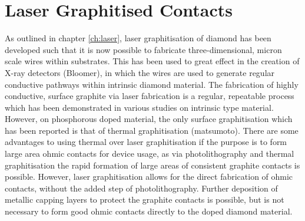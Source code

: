 \section{Laser Graphitised Contacts}
As outlined in chapter \ref{ch:laser}, laser graphitisation of diamond has been developed such that it is now possible to fabricate three-dimensional, micron scale wires within substrates. This has been used to great effect in the creation of X-ray detectors (Bloomer), in which the wires are used to generate regular conductive pathways within intrinsic diamond material. The fabrication of highly conductive, surface graphite via laser fabrication is a regular, repeatable process which has been demonstrated in various studies on intrinsic type material. However, on phosphorous doped material, the only surface graphitisation which has been reported is that of thermal graphitisation (matsumoto). There are some advantages to using thermal over laser graphitisation if the purpose is to form large area ohmic contacts for device usage, as via photolithography and thermal graphitisation the rapid formation of large areas of consistent graphite contacts is possible. However, laser graphitisation allows for the direct fabrication of ohmic contacts, without the added step of photolithography. Further deposition of metallic capping layers to protect the graphite contacts is possible, but is not necessary to form good ohmic contacts directly to the doped diamond material.
